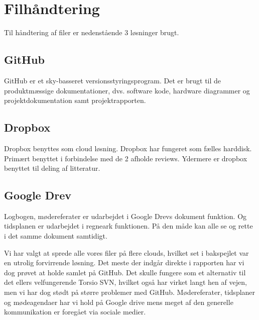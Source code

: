 \section{Filhåndtering}
Til håndtering af filer er nedenstående 3 løsninger brugt. 

\subsection{GitHub}
GitHub er et sky-basseret versionsstyringsprogram. Det er brugt til de produktmæssige dokumentationer, dvs. software kode, hardware diagrammer og projektdokumentation samt projektrapporten.

\subsection{Dropbox}
Dropbox benyttes som cloud løsning. Dropbox har fungeret som fælles harddisk. Primært benyttet i forbindelse med de 2 afholde reviews. Ydermere er dropbox benyttet til deling af litteratur. 

\subsection{Google Drev}
Logbogen, mødereferater er udarbejdet i Google Drevs dokument funktion. Og tidsplanen er udarbejdet i regneark funktionen. På den måde kan alle se og rette i det samme dokument samtidigt. 


Vi har valgt at sprede alle vores filer på flere clouds, hvilket set i bakspejlet var en utrolig forvirrende løsning. 
Det meste der indgår direkte i rapporten har vi dog prøvet at holde samlet på GitHub. Det skulle fungere som et alternativ til det ellers velfungerende Torsio SVN, hvilket også har virket langt hen af vejen, men vi har dog stødt på større problemer med GitHub. 
Mødereferater, tidsplaner og mødeagendaer har vi hold på Google drive mens meget af den generelle kommunikation er foregået via sociale medier. 


